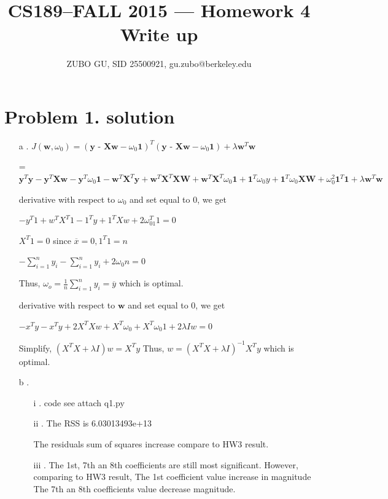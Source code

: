 \documentclass[11pt]{article}
\title{CS189--FALL 2015 --- Homework 4 Write up}
\author{ZUBO GU, SID 25500921, gu.zubo@berkeley.edu}
\date{}
\begin{document}
\maketitle

\section*{Problem 1. solution}
\begin{itemize}
\item[a].
$J(\textbf{w},\omega_0) = (\textbf{y - Xw} - \omega_0 \textbf{1})^T(\textbf{y - Xw} - \omega_0 \textbf{1}) + \lambda \textbf{w}^T\textbf{w}$

=$\textbf{y}^T\textbf{y} - \textbf{y}^T\textbf{Xw} - \textbf{y}^T\omega_0\textbf{1} - \textbf{w}^T\textbf{X}^T\textbf{y} +  \textbf{w}^T\textbf{X}^T\textbf{XW}  + \textbf{w}^T\textbf{X}^T\omega_0\textbf{1} + \textbf{1}^T\omega_0 y+ \textbf{1}^T\omega_0 \textbf{XW} +
\omega_0^2 \textbf{1}^T\textbf{1} + \lambda \textbf{w}^T\textbf{w}$

derivative with respect to $\omega_0$ and set equal to 0, we get

$-y^T1 + w^TX^T1 - 1^Ty+1^TXw + 2\omega_01^T1 = 0$

$X^T1 = 0$ since $\overline{x}= 0,  1^T1 = n$

$-\sum_{i=1}^{n} y_i  -\sum_{i=1}^{n} y_i + 2 \omega_0 n = 0$

Thus, $\omega_o = \frac{1}{n} \sum_{i=1}^{n} y_i = \overline{y}$ which is optimal.

derivative with respect to $\textbf{w}$ and set equal to 0, we get

$-x^Ty - x^Ty + 2 X^TXw + X^T\omega_0 + X^T\omega_0 1 + 2\lambda I w = 0$

Simplify, $(X^TX + \lambda I)w = X^Ty$
Thus, $ w= (X^TX + \lambda I)^{-1}X^Ty$ which is optimal.

\item[b].
\begin{itemize}

\item[i].
code see attach q1.py

\item[ii].
The RSS is 6.03013493e+13

The residuals sum of squares increase compare to HW3 result.

\item[iii].
The 1st, 7th an 8th coefficients are still most significant. However, comparing to HW3 result, 
The 1st coefficient value increase in magnitude
The 7th an 8th coefficients value decrease magnitude.


\end{itemize}
\end{itemize}
\end{document}
